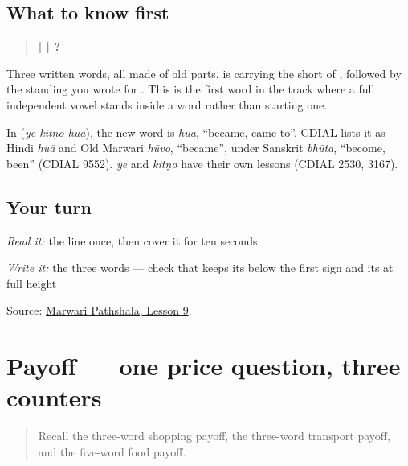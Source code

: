\subsection*{What to know first}
\begin{quote}
\textbf{ |  | ?}
\end{quote}

Three written words, all made of old parts. \textbf{} is \textbf{} carrying the short \textbf{} of \textbf{}, followed by the standing \textbf{} you wrote for \textbf{}. This is the first word in the track where a full independent vowel stands inside a word rather than starting one.

\begin{cousinweb}
In \textbf{  } (\emph{ye kitṇo huā}), the new word is \emph{huā}, \textquotedblleft{}became, came to\textquotedblright{}. CDIAL lists it as Hindi \emph{huā} and Old Marwari \emph{hūvo}, \textquotedblleft{}became\textquotedblright{}, under Sanskrit \emph{bhūta}, \textquotedblleft{}become, been\textquotedblright{} (CDIAL 9552). \emph{ye} and \emph{kitṇo} have their own lessons (CDIAL 2530, 3167).
\end{cousinweb}

\subsection*{Your turn}
\emph{Read it:} the line once, then cover it for ten seconds

\emph{Write it:} the three words — check that \textbf{} keeps its \textbf{} below the first sign and its \textbf{} at full height

\begin{tcolorbox}[breakable,colback=teal!4,colframe=teal!35!black,title={Before you move on}]
Source: \href{https://www.marwaripathshala.com/marwari-lesson-9-english}{Marwari Pathshala, Lesson 9}.
\end{tcolorbox}
\section[Practice]{Payoff — one price question, three counters}

\label{lesson:MW-C22-price-three}



\begin{quote}
Recall the three-word shopping payoff, the three-word transport payoff, and the five-word food payoff.
\end{quote}

